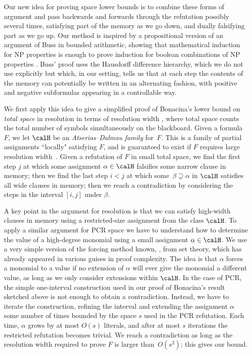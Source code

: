 Our new idea for proving space lower bounds is to combine 
these forms of argument and
pass backwards and forwards through the refutation possibly several 
times, 
satisfying part of the memory as we go down, and dually falsifying part as we go up.  
Our method is inspired by a propositional version of  an argument of Buss in bounded arithmetic,
showing that mathematical induction for NP properties is enough  to prove induction for boolean combinations of 
NP properties \cite[Corollary~4]{Buss90}. Buss' proof uses the Hausdorff difference hierarchy, 
which we do not use explicitly but which, in our setting, tells us that at each step the contents
of the memory can potentially be written in an alternating fashion, with positive and negative
subformulas appearing in a controllable way.

We first apply this idea to give a simplified proof of Bonacina's lower bound on \emph{total space} 
in resolution in terms of resolution width
\cite{DBLP:conf/icalp/Bonacina16,DBLP:journals/siamcomp/BonacinaGT16},
where total space counts the total number of symbols simultaneously on the blackboard.
Given a formula $F$, we let $\calH$ be
an \emph{Atserias--Dalmau family} for~$F$. 
This is a family of partial assignments ``locally" satisfying $F$, 
and is guaranteed to exist if $F$ requires large resolution width~\cite{DBLP:journals/jcss/AtseriasD08}.
Given a refutation of $F$ in small total space, we find the first step $j$ at which some assignment $\alpha \in \calH$ falsifies some narrow
clause in memory; then we find the last step $i<j$ at which some~$\beta \supseteq \alpha$ in $\calH$
satisfies all wide clauses in memory; then we reach a contradiction by considering the steps in
the interval $[i,j]$ under $\beta$.

A key point in the argument for resolution is that we can satisfy high-width clauses in memory using a restricted-size assignment from the class $\calH$.  
To apply a similar argument for PCR space we  have to understand how to determine
the value of a high-degree monomial using a small assignment $\alpha \in \calH$.
We use a very simple version of the forcing method known, \eg, from set theory, 
which has already appeared in various guises in proof complexity.
The idea is that $\alpha$ forces a monomial to a value if
no extension of $\alpha$ will ever give the monomial 
a different value, as long as we only consider extensions within $\calH$. 
In the case of PCR, the simple one-interval construction used in our proof of Bonacina's result sketched above
is not enough to obtain a contradiction.
Instead, we have to iterate the construction, refining the interval and extending the assignment $\alpha$
some number of times bounded by the space $s$ used in the PCR refutation. 
Each time, $\alpha$ grows by at most $O(s)$ literals, and after at most $s$ iterations the restricted refutation becomes trivial.
We reach a contradiction as long as the resolution width required to prove $F$ is larger than~$O(s^2)$; this gives our bound.

